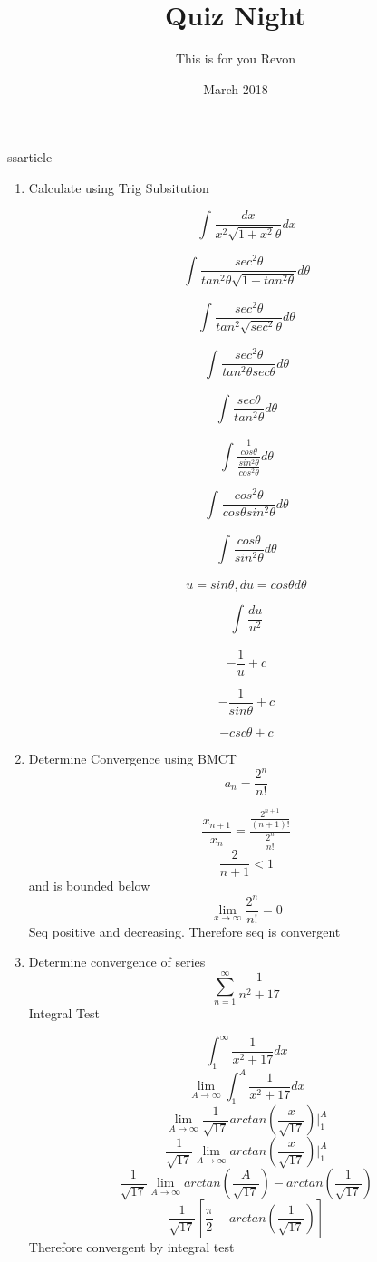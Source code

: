 ss{article}
\usepackage[utf8]{inputenc}
\usepackage{amsfonts,amssymb,amsthm,fancybox,amsmath,fullpage}
\usepackage{times}
\usepackage{color}
\usepackage{listings}
\usepackage{tikz}

\title{Quiz Night}
\author{This is for you Revon}
\date{March 2018}



\maketitle

\begin{enumerate}
    \item Calculate using Trig Subsitution \par $$\int_{}^{} \frac{dx}{x^2\sqrt{1+x^2} \theta} dx$$ \par
    $$\int_{}^{} \frac{sec^2\theta}{tan^2\theta \sqrt{1+tan^2\theta}} d\theta$$ \par
    $$\int_{}^{} \frac{sec^2\theta}{tan^2\sqrt{sec^2}\theta} d\theta$$ \par
    $$\int_{}^{} \frac{sec^2\theta}{tan^2\theta sec\theta} d\theta$$ \par
    $$\int_{}^{} \frac{sec\theta}{tan^2\theta} d\theta$$ \par
    $$\int_{}^{} \frac{\frac{1}{cos\theta}}{\frac{sin^2\theta}{cos^2\theta}} d\theta$$ \par
    $$\int_{}^{} \frac{cos^2\theta}{cos\theta sin^2\theta} d\theta$$ \par
    $$\int_{}^{} \frac{cos\theta}{sin^2\theta} d\theta$$ \par
    $$u = sin\theta, du=cos\theta d\theta $$ \par
    $$\int_{}^{} \frac{du}{u^2}$$ \par
    $$-\frac{1}{u} + c$$ \par
    $$-\frac{1}{sin\theta} + c$$ \par
    $$-csc\theta + c$$ \par
    
    \item Determine Convergence using BMCT
    $$ a_n = \frac{2^n}{n!}$$
    
    $$\frac{x_{n+1}}{x_n} = \frac{\frac{2^{n+1}}{(n+1)!}}{\frac{2^n}{n!}}$$
    $$\frac{2}{n+1} < 1$$
    and is bounded below
    $$\lim_{x\to\infty} \frac{2^n}{n!} = 0$$
    Seq positive and decreasing. Therefore seq is convergent
    
    \item Determine convergence of series 
    $$\sum_{n=1}^{\infty} \frac{1}{n^2 +17}$$
    Integral Test \par
    $$ \int_{1}^{\infty} \frac{1}{x^2 +17} dx $$
    $$ \lim_{A\to\infty} \int_{1}^{A} \frac{1}{x^2 +17} dx $$
    $$\lim_{A\to\infty}  \frac{1}{\sqrt{17}}  arctan(\frac{x}{\sqrt{17}}) \Big|_1^A$$
    $$ \frac{1}{\sqrt{17}} \lim_{A\to\infty} arctan(\frac{x}{\sqrt{17}}) \Big|_1^A$$
    $$ \frac{1}{\sqrt{17}} \lim_{A\to\infty} arctan(\frac{A}{\sqrt{17}}) - arctan(\frac{1}{\sqrt{17}})$$
     $$ \frac{1}{\sqrt{17}}[ \frac{\pi}{2} - arctan(\frac{1}{\sqrt{17}})]$$
     Therefore convergent by integral test \par
    
    
    
    
\end{enumerate}



